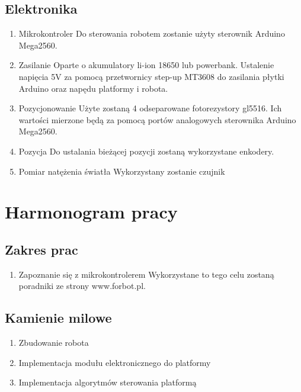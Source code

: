 \documentclass[10pt, a4paper]{article}
\begin{document}
\subsection{Elektronika}
\begin{enumerate}
	\item Mikrokontroler
	\newline
	Do sterowania robotem zostanie użyty sterownik Arduino Mega2560.
	
	\item Zasilanie
	\newline
	Oparte o akumulatory li-ion 18650 lub powerbank. Ustalenie napięcia 5V za pomocą przetwornicy step-up MT3608 do zasilania płytki Arduino oraz napędu platformy i robota.
	
	\item Pozycjonowanie
	\newline
	Użyte zostaną 4 odseparowane fotorezystory gl5516. Ich wartości mierzone będą za pomocą portów analogowych  sterownika Arduino Mega2560.
	
	\item Pozycja
	\newline
	Do ustalania bieżącej pozycji zostaną wykorzystane enkodery.
	
	\item Pomiar natężenia światła
	\newline
	Wykorzystany zostanie czujnik
\end{enumerate}

\section{Harmonogram pracy}

\subsection{Zakres prac}
\begin{enumerate}
	\item Zapoznanie się z mikrokontrolerem
	\newline
	Wykorzystane to tego celu zostaną poradniki ze strony www.forbot.pl.
\end{enumerate}
\subsection{Kamienie milowe}
\begin{enumerate}
	\item Zbudowanie robota
	\item Implementacja modułu elektronicznego do platformy
	\item Implementacja algorytmów sterowania platformą
\end{enumerate}
\end{document}
